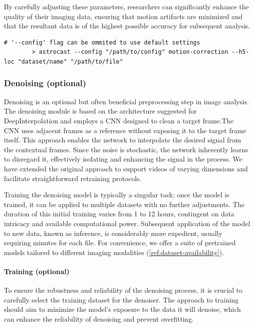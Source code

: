 \documentclass[utf8]{FrontiersinHarvard}
\begin{document}
    By carefully adjusting these parameters, researchers can significantly enhance the quality of their imaging data, ensuring that motion artifacts are minimized and that the resultant data is of the highest possible accuracy for subsequent analysis.

    \begin{lstlisting}[style=bashStyle]
        # '--config' flag can be ommited to use default settings
        > astrocast --config "/path/to/config" motion-correction --h5-loc "dataset/name" "/path/to/file"
    \end{lstlisting}

    \subsubsection{Denoising (optional)}

    Denoising is an optional but often beneficial preprocessing step in image analysis. The denoising module is based on the architecture suggested for DeepInterpolation\citep{lecoq_removing_2021} and employs a \ac{CNN} designed to clean a target frame.The \ac{CNN} uses adjacent frames as a reference without exposing it to the target frame itself. This approach enables the network to interpolate the desired signal from the contextual frames. Since the noise is stochastic, the network inherently learns to disregard it, effectively isolating and enhancing the signal in the process. We have extended the original approach to support videos of varying dimensions and facilitate straightforward retraining protocols.

    Training the denoising model is typically a singular task; once the model is trained, it can be applied to multiple datasets with no further adjustments. The duration of this initial training varies from 1 to 12 hours, contingent on data intricacy and available computational power. Subsequent application of the model to new data, known as inference, is considerably more expedient, usually requiring minutes for each file. For convenience, we offer a suite of pretrained models tailored to different imaging modalities (\ref{ref:dataset-availability}).

    \paragraph{Training (optional)}

    To ensure the robustness and reliability of the denoising process, it is crucial to carefully select the training dataset for the denoiser. The approach to training should aim to minimize the model's exposure to the data it will denoise, which can enhance the reliability of denoising and prevent overfitting.
\end{document}
